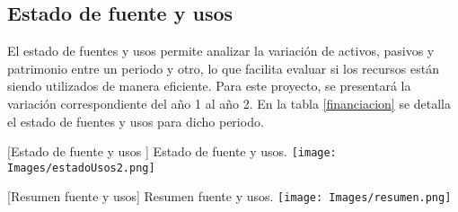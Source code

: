 \subsection{Estado de fuente y usos}

El estado de fuentes y usos permite analizar la variación de activos, pasivos y patrimonio entre un periodo y otro, lo que facilita evaluar si los recursos están siendo utilizados de manera eficiente. Para este proyecto, se presentará la variación correspondiente del año 1 al año 2. En la tabla \ref{financiacion} se detalla el estado de fuentes y usos para dicho periodo.

\vspace{2mm}
\begin{minipage}{0.9\textwidth}
\centering
{}[{Estado de fuente y usos
}]{ Estado de fuente y usos. }
\label{financiacion}
\texttt{[image: Images/estadoUsos2.png]}
\end{minipage}

\vspace{2mm}
\begin{minipage}{0.9\textwidth}
\centering
{}[{Resumen fuente y usos}]{ Resumen fuente y usos. }
\label{resumen}
\texttt{[image: Images/resumen.png]}
\end{minipage}
